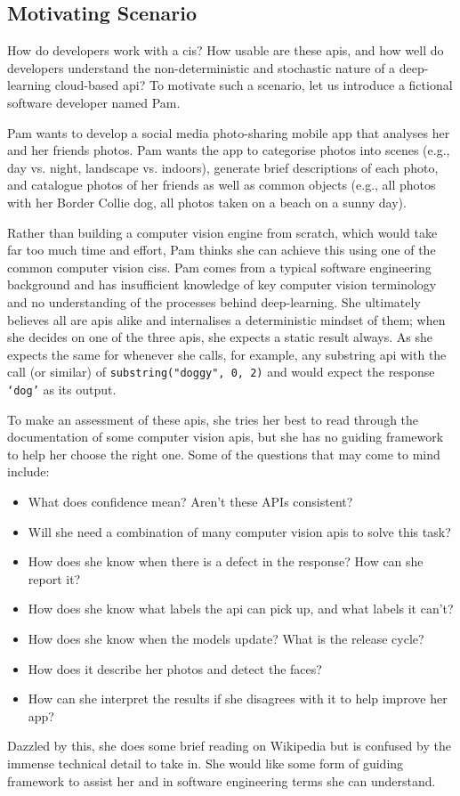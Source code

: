 \subsection{Motivating Scenario}
\label{ssec:introduction:motivation:scenario}

  How do developers work with a \gls{cis}? How usable are these \glspl{api}, and how well do developers understand the non-deterministic and stochastic nature of a deep-learning cloud-based \gls{api}? To motivate such a scenario, let us introduce a fictional software developer named Pam.

Pam wants to develop a social media photo-sharing mobile app that analyses her and her friends photos. Pam wants the app to categorise photos into scenes (e.g., day vs. night, landscape vs. indoors), generate brief descriptions of each photo, and catalogue photos of her friends as well as common objects (e.g., all photos with her Border Collie dog, all photos taken on a beach on a sunny day).

Rather than building a computer vision engine from scratch, which would take far too much time and effort, Pam thinks she can achieve this using one of the common computer vision \glspl{cis}. Pam comes from a typical software engineering background and has insufficient knowledge of key computer vision terminology and no understanding of the processes behind deep-learning. She ultimately believes all are \glspl{api} alike and internalises a deterministic mindset of them; when she decides on one of the three \glspl{api}, she expects a static result always. As she expects the same for whenever she calls, for example, any substring \gls{api} with the call (or similar) of \texttt{substring("doggy", 0, 2)} and would expect the response \texttt{`dog'} as its output.

To make an assessment of these \glspl{api}, she tries her best to read through the documentation of some computer vision \glspl{api}, but she has no guiding framework to help her choose the right one. Some of the questions that may come to mind include:

\begin{itemize}
  \item What does confidence mean? Aren't these APIs consistent?
  \item Will she need a combination of many computer vision \glspl{api} to solve this task?
  \item How does she know when there is a defect in the response? How can she report it?
  \item How does she know what labels the \gls{api} can pick up, and what labels it can't?
  \item How does she know when the models update? What is the release cycle?
  \item How does it describe her photos and detect the faces?
  \item How can she interpret the results if she disagrees with it to help improve her app?
\end{itemize}

Dazzled by this, she does some brief reading on Wikipedia but is confused by the immense technical detail to take in. She would like some form of guiding framework to assist her and in software engineering terms she can understand.
